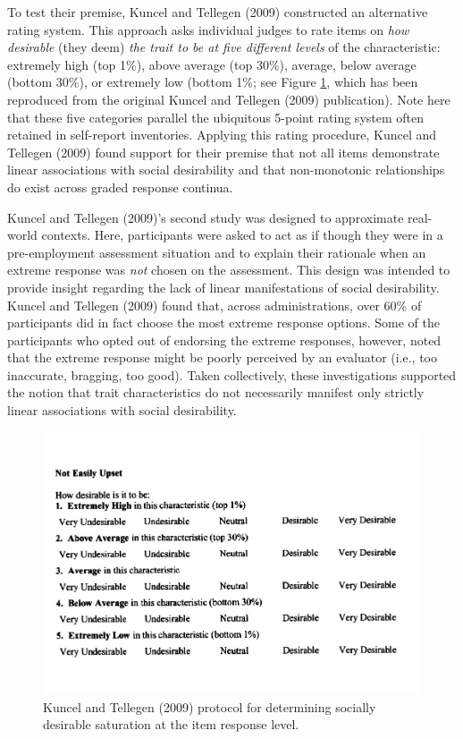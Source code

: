 \documentclass[
  ,jou]{apa6}
\begin{document}
To test their premise, Kuncel and Tellegen (2009) constructed an alternative rating system. This approach asks individual judges to rate items on \emph{how desirable} (they deem) \emph{the trait to be at five different levels} of the characteristic: extremely high (top 1\%), above average (top 30\%), average, below average (bottom 30\%), or extremely low (bottom 1\%; see Figure \ref{fig:Figure1}, which has been reproduced from the original Kuncel and Tellegen (2009) publication). Note here that these five categories parallel the ubiquitous 5-point rating system often retained in self-report inventories. Applying this rating procedure, Kuncel and Tellegen (2009) found support for their premise that not all items demonstrate linear associations with social desirability and that non-monotonic relationships do exist across graded response continua.

Kuncel and Tellegen (2009)'s second study was designed to approximate real-world contexts. Here, participants were asked to act as if though they were in a pre-employment assessment situation and to explain their rationale when an extreme response was \emph{not} chosen on the assessment. This design was intended to provide insight regarding the lack of linear manifestations of social desirability. Kuncel and Tellegen (2009) found that, across administrations, over 60\% of participants did in fact choose the most extreme response options. Some of the participants who opted out of endorsing the extreme responses, however, noted that the extreme response might be poorly perceived by an evaluator (i.e., too inaccurate, bragging, too good). Taken collectively, these investigations supported the notion that trait characteristics do not necessarily manifest only strictly linear associations with social desirability.

\begin{figure}
\centering
\includegraphics{KuncelTellegen_files/figure-latex/Figure1-1.pdf}
\caption{\label{fig:Figure1}Kuncel and Tellegen (2009) protocol for determining socially desirable saturation at the item response level.}
\end{figure}
\end{document}
